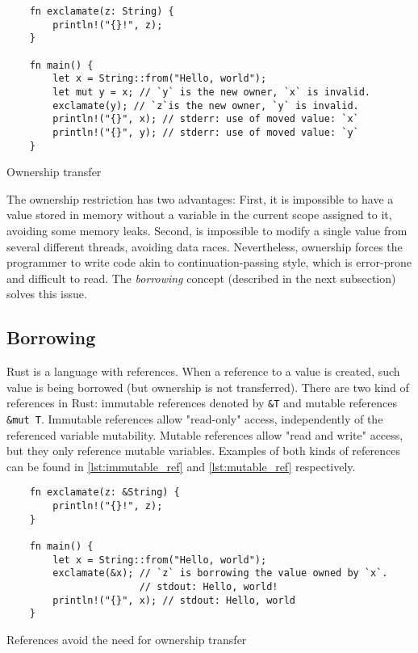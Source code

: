 \begin{listing}[ht]
	\begin{verbatim}
    fn exclamate(z: String) {
        println!("{}!", z);
    }

    fn main() {
        let x = String::from("Hello, world");
        let mut y = x; // `y` is the new owner, `x` is invalid.
        exclamate(y); // `z`is the new owner, `y` is invalid.
        println!("{}", x); // stderr: use of moved value: `x`
        println!("{}", y); // stderr: use of moved value: `y`
    }
	\end{verbatim}
  \caption{Ownership transfer}
  \label{lst:ownership}
\end{listing}

The ownership restriction has two advantages: First, it is impossible to have a
value stored in memory without a variable in the current scope assigned to it,
avoiding some memory leaks. Second, is impossible to modify a single value from
several different threads, avoiding data races. Nevertheless, ownership forces
the programmer to write code akin to continuation-passing style, which is
error-prone and difficult to read. The \textit{borrowing} concept (described in
the next subsection) solves this issue.

\subsection{Borrowing}

Rust is a language with references. When a reference to a value is created, such
value is being borrowed (but ownership is not transferred). There are two kind
of references in Rust: immutable references denoted by \texttt{\&T} and mutable
references \texttt{\&mut T}. Immutable references allow "read-only" access,
independently of the referenced variable mutability. Mutable references allow
"read and write" access, but they only reference mutable variables. Examples of
both kinds of references can be found in \ref{lst:immutable_ref} and
\ref{lst:mutable_ref} respectively.

\begin{listing}[ht]
	\begin{verbatim}
    fn exclamate(z: &String) {
        println!("{}!", z);
    }

    fn main() {
        let x = String::from("Hello, world");
        exclamate(&x); // `z` is borrowing the value owned by `x`.
                       // stdout: Hello, world! 
        println!("{}", x); // stdout: Hello, world
    }
	\end{verbatim}
  \caption{References avoid the need for ownership transfer}
  \label{lst:immutable_ref}
\end{listing}

